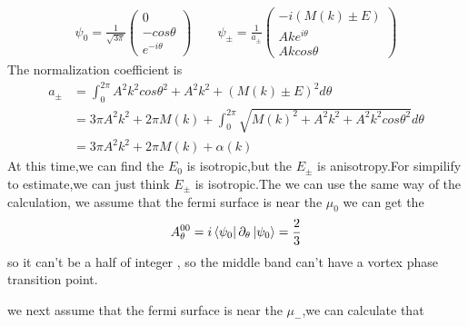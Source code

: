 \documentclass[4pt]{article}
\begin{document}
\begin{align}
	\psi_0=\frac{1}{\sqrt{3\pi}}
	\begin{pmatrix}
		0\\
		-cos\theta\\
		e^{-i\theta}
	\end{pmatrix}
\qquad 
	\psi_{\pm}=\frac{1}{a_{\pm}}
\begin{pmatrix}
		-i(M(k)\pm E)\\
		Ake^{i\theta}\\
		Akcos\theta
\end{pmatrix}
\end{align}
The normalization coefficient is
\begin{align}
	a_{\pm}&=\int_0^{2\pi}A^2k^2cos\theta^2+A^2k^2+(M(k)\pm E)^2 d\theta \\
	&=3\pi A^2k^2+2\pi M(k)+\int_0^{2\pi}\sqrt{M(k)^2+A^2k^2+A^2k^2cos\theta^2}d\theta\\
	&=3\pi A^2k^2+2\pi M(k)+\alpha (k)
\end{align}
At this time,we can find the $E_{0}$ is isotropic,but the $E_{\pm}$ is anisotropy.For simpilify to estimate,we can just think $E_{\pm}$ is isotropic.The we can use the same way of the calculation, we assume that the fermi surface is near the $\mu_{0}$
we can get the 
\begin{align}
	A_{\theta}^{00}=i\bra{\psi_0}\partial_{\theta}\ket{\psi_0}=\frac{2}{3}
\end{align}
so it can't be a half of integer , so the middle band can't have a vortex phase transition point.
\par 
we next assume that the fermi surface is near the $\mu_{-}$,we can calculate that 
 
\end{document}
